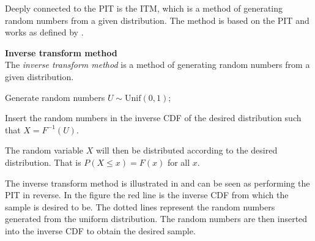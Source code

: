 Deeply connected to the \gls{PIT} is the \gls{ITM}, which is a method of generating random numbers from a given distribution. The method is based on the \gls{PIT} and works as defined by .
\begin{definition}\label{def:InverseTransformMethod}
    \textbf{Inverse transform method} \\
    The \emph{inverse transform method} is a method of generating random numbers from a given distribution.
    \begin{compactenum}
        \item Generate random numbers $U \sim \mathrm{Unif}(0,1)$;
        \item Insert the random numbers in the inverse \gls{CDF} of the desired distribution such that $X = F^{-1}(U)$.
    \end{compactenum}
    The random variable $X$ will then be distributed according to the desired distribution. That is $P(X\leq x) = F(x)$ for all $x$.
\end{definition}

The inverse transform method is illustrated in  and can be seen as performing the \gls{PIT} in reverse. In the figure the red line is the inverse \gls{CDF} from which the sample is desired to be. The dotted lines represent the random numbers generated from the uniform distribution. The random numbers are then inserted into the inverse \gls{CDF} to obtain the desired sample.

